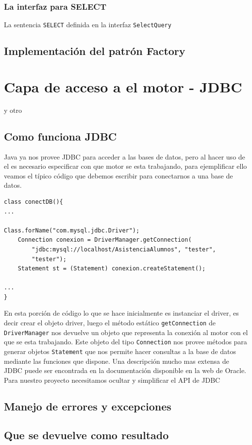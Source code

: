\subsubsection{La interfaz para SELECT}
La sentencia \verb=SELECT= definida en la interfaz \verb=SelectQuery=

\subsection{Implementación del patrón Factory}










\section{Capa de acceso a el motor - JDBC}
y otro

\subsection{Como funciona JDBC}
Java ya nos provee JDBC para acceder a las bases de datos, pero al hacer uso de el es necesario especificar con que motor se esta trabajando, para ejemplificar ello veamos el típico código que debemos escribir para conectarnos a una base de datos.

\begin{lstlisting}[title=Porción de codigo java para la conexión a una base de datos]
class conectDB(){
...

Class.forName("com.mysql.jdbc.Driver");
	Connection conexion = DriverManager.getConnection(
		"jdbc:mysql://localhost/AsistenciaAlumnos", "tester",
		"tester");
	Statement st = (Statement) conexion.createStatement();

...
}
\end{lstlisting}

En esta porción de código lo que se hace inicialmente es instanciar el driver, es decir crear el objeto driver, luego el método estático \verb=getConnection= de 	\verb=DriverManager= nos devuelve un objeto que representa la conexión al motor con el que se esta trabajando. Este objeto del tipo \verb=Connection= nos provee métodos para generar objetos \verb=Statement= que nos permite hacer consultas a la base de datos mediante las funciones que dispone. Una descripción mucho mas extensa de JDBC puede ser encontrada en la documentación disponible en la web de Oracle\citep{java:jdbc}.
Para nuestro proyecto necesitamos ocultar y simplificar el API de JDBC
\subsection{Manejo de errores y excepciones}

\subsection{Que se devuelve como resultado}
